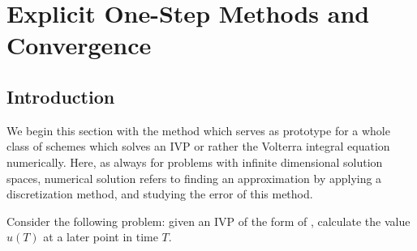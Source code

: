 \chapter{Explicit One-Step Methods and Convergence}

\section{Introduction}
\begin{example}
  We begin this section with the method which serves as prototype for
  a whole class of schemes which solves an IVP or rather the Volterra
  integral equation numerically. Here, as always for problems with
  infinite dimensional solution spaces, numerical solution refers to
  finding an approximation by applying a discretization method, and
  studying the error of this method.
  
  Consider the following problem: given an IVP of the form of ,
  calculate the value $u(T)$ at a later point in time $T$.
  

\end{example}
